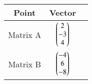 \begin{tabular}{|c|c|c|}
    \hline
    Point & Vector \\
    \hline
    Matrix A & $\begin{pmatrix}2\\-3\\4\end{pmatrix}$ \\
    \hline
    Matrix B & $\begin{pmatrix}-4\\6\\-8\end{pmatrix}$ \\
    \hline
\end{tabular}
